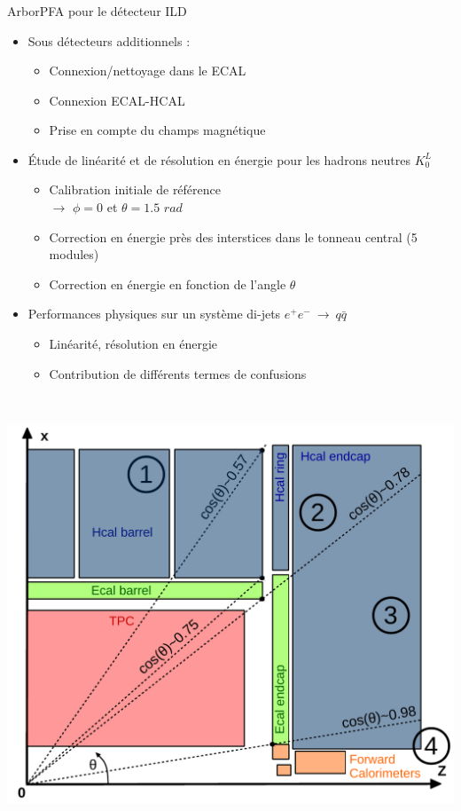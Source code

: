 \documentclass[8pt]{beamer}
\begin{document}
  \begin{frame}
  \frametitle{\secname}
  \framesubtitle{\subsecname}
    \begin{minipage}{0.53\linewidth}
      \begin{block}{ArborPFA pour le détecteur ILD}
        \begin{itemize}
          \item Sous détecteurs additionnels :
          \begin{itemize}
            \item Connexion/nettoyage dans le ECAL
            \item Connexion ECAL-HCAL
            \item Prise en compte du champs magnétique %
          \end{itemize}
          \item Étude de linéarité et de résolution en énergie pour les hadrons neutres $K_{0}^{L}$
          \begin{itemize}
            \item Calibration initiale de référence \\
            $\rightarrow$ $\phi=0$ et $\theta=1.5$ $rad$
            \item Correction en énergie près des interstices dans le tonneau central (5 modules)
            \item Correction en énergie en fonction de l'angle $\theta$
          \end{itemize}
          \item Performances physiques sur un système di-jets $e^+e^-~\rightarrow~q\bar{q}$
          \begin{itemize}
            \item Linéarité, résolution en énergie
            \item Contribution de différents termes de confusions
          \end{itemize}
        \end{itemize}
      \end{block}
    \end{minipage} ~~~~\hfill
    \begin{minipage}{0.43\linewidth}
      \begin{center}
        \includegraphics[width=0.8\linewidth]{BarrelEndcapRegions.pdf} \\

\end{center}
\end{minipage}
\end{frame}
\end{document}
